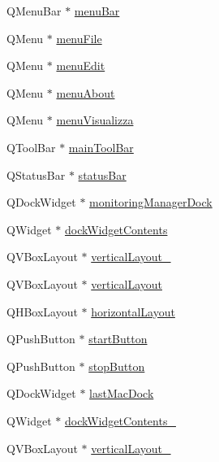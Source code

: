 \begin{DoxyCompactItemize}
\item 
Q\+Menu\+Bar $\ast$ \hyperlink{class_ui___main_window_a2be1c24ec9adfca18e1dcc951931457f}{menu\+Bar}
\item 
Q\+Menu $\ast$ \hyperlink{class_ui___main_window_a7ba84cb4cdd6a12dc83bf4e100bd8d80}{menu\+File}
\item 
Q\+Menu $\ast$ \hyperlink{class_ui___main_window_aa2a8beb7420d9a6d513949dd5661090a}{menu\+Edit}
\item 
Q\+Menu $\ast$ \hyperlink{class_ui___main_window_aa11a672d324fa5c42a5dc488e99bc216}{menu\+About}
\item 
Q\+Menu $\ast$ \hyperlink{class_ui___main_window_a6047c82da41086df88ed79f21aaed5c1}{menu\+Visualizza}
\item 
Q\+Tool\+Bar $\ast$ \hyperlink{class_ui___main_window_a5172877001c8c7b4e0f6de50421867d1}{main\+Tool\+Bar}
\item 
Q\+Status\+Bar $\ast$ \hyperlink{class_ui___main_window_a50fa481337604bcc8bf68de18ab16ecd}{status\+Bar}
\item 
Q\+Dock\+Widget $\ast$ \hyperlink{class_ui___main_window_a4cdc18065deb2f27d942e8a96fd6a51f}{monitoring\+Manager\+Dock}
\item 
Q\+Widget $\ast$ \hyperlink{class_ui___main_window_a765ded8236736213d556f6f91941808e}{dock\+Widget\+Contents}
\item 
Q\+V\+Box\+Layout $\ast$ \hyperlink{class_ui___main_window_a0c01bad60d9f422a1258e710635a2f65}{vertical\+Layout\+\_}
\item 
Q\+V\+Box\+Layout $\ast$ \hyperlink{class_ui___main_window_aecd96a04789fcfec3f98d80390ad8184}{vertical\+Layout}
\item 
Q\+H\+Box\+Layout $\ast$ \hyperlink{class_ui___main_window_acd6fdc9ebacc4b25b834162380d75ce8}{horizontal\+Layout}
\item 
Q\+Push\+Button $\ast$ \hyperlink{class_ui___main_window_a58a84cd3057ab5459819f986b08942b1}{start\+Button}
\item 
Q\+Push\+Button $\ast$ \hyperlink{class_ui___main_window_a32791e01697a0fa4c2e5219b2d717a95}{stop\+Button}
\item 
Q\+Dock\+Widget $\ast$ \hyperlink{class_ui___main_window_a0c4ca3bb9b533d0ac5ccad1fef9c5e45}{last\+Mac\+Dock}
\item 
Q\+Widget $\ast$ \hyperlink{class_ui___main_window_af54c2ad50aa3702180e8ca2026d34088}{dock\+Widget\+Contents\+\_}
\item 
Q\+V\+Box\+Layout $\ast$ \hyperlink{class_ui___main_window_afb1464f1d82290bdb55ce9c30a62c2c5}{vertical\+Layout\+\_}

\end{DoxyCompactItemize}
